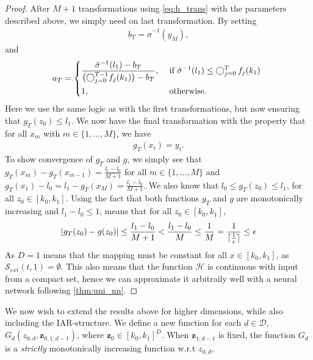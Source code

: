 \begin{proof}
    After \(M+1\) transformations using \cref{eq:h_trans} with the parameters described above, we simply need on last transformation. By
    setting 
    \begin{align*}
        b_T = \hat{\sigma}^{-1}(y_M), 
    \end{align*}
    and 
    \begin{align*}
        a_T = 
        \begin{dcases}
            \frac{\hat{\sigma}^{-1}(l_1) - b_T}{\left(\bigcirc_{j=0}^{T-1}f_j(k_1)\right) - b_T}, & \text{ if \(\hat{\sigma}^{-1}(l_1) \leq \bigcirc_{j=0}^T\, 
            f_j(k_1)\) }\\
            1, & \text{ otherwise. }
        \end{dcases}
    \end{align*}
    Here we use the same logic as with the first transformations, but now ensuring that \(g_T(z_0) \leq l_1\).
    We now have the final transformation with the property that for all \(x_m\) with \(m \in \{1,\dots, M\}\), we have
    \begin{align*}
        g_T(x_t) = y_t.
    \end{align*}
    To show convergence of \(g_T\) and \(g\), we simply see that \(g_T(x_m) - g_T(x_{m-1}) = \frac{l_1 - l_0}{M+1}\) for all \(m \in \{1,\dots,M\}\) 
    and
    \(g_T(x_1)-l_0 = l_1 - g_T(x_M) = \frac{l_1-l_0}{M+1}\). We also know that \(l_0\leq g_T(z_0) \leq l_1\), for all \(z_0 \in [k_0,k_1]\).
    Using the fact that both functions \(g_T\) and \(g\) are monotonically increasing 
    and \(l_1 -l_0 \leq 1\), means that for all \(z_0 \in [k_0, k_1]\),
    \begin{align*}
        \lvert g_T(z_0) - g(z_0) \rvert \leq \frac{l_1-l_0}{M+1} < \frac{l_1-l_0}{M} \leq \frac{1}{M}
        = \frac{1}{\lceil\frac{1}{\epsilon}\rceil} 
        \leq \epsilon
    \end{align*}
    As \(D=1\) means that the mapping must be constant for all \(x\in [k_0, k_1]\), as \(\mathcal{S}_{ext}(t,1) = \emptyset\). This also 
    means that the function \(\mathcal{H}\) is continuous with input from a compact set, hence we can approximate it arbitraily well
    with a neural network following \cref{thm:uni_nn}.
\end{proof}
We now wish to extend the results above for higher dimensions, while also including the IAR-structure. We define a new 
function for each \(d \in \mathcal{D}\), \(G_d(z_{0,d}, \bm z_{0,1:d-1})\), where \(\bm z_0 \in [k_0,k_1]^D\). 
When \(\bm z_{1:d-1}\) is fixed, the function \(G_d\) is a \emph{strictly} monotonically increasing function w.r.t \(z_{0,d}\), 
